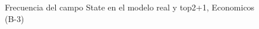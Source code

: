 \begin{figure}[H]
    \centering
    
    \caption{Frecuencia del campo State en el modelo real y top2+1, Economicos (B-3)}
    \label{frecuency-State-top2+1}
\end{figure}